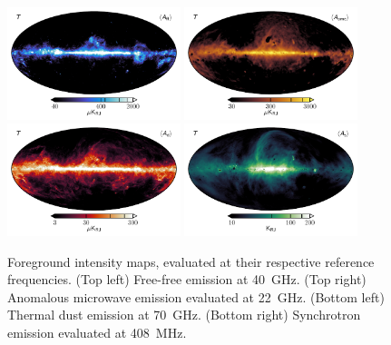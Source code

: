 \documentclass[twocolumn]{../../common/aa}
\begin{document}
\begin{figure}
	\centering
	\includegraphics[width=0.45\textwidth]{figures/ff_I.pdf}
	\includegraphics[width=0.45\textwidth]{figures/ame_I.pdf}\\
	\includegraphics[width=0.45\textwidth]{figures/dust_I.pdf}
	\includegraphics[width=0.45\textwidth]{figures/synch_I.pdf}\\
	\caption{Foreground intensity maps, evaluated at their respective reference frequencies. (Top left) Free-free emission at 40~GHz. (Top right) Anomalous microwave emission evaluated at 22~GHz. (Bottom left) Thermal dust emission at 70~GHz. (Bottom right) Synchrotron emission evaluated at 408~MHz.}\label{fig:intensity_foregrounds}
\end{figure}
\end{document}
